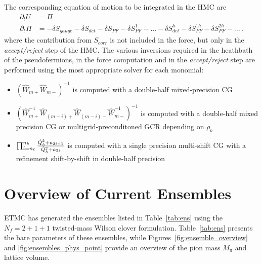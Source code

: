 \documentclass[a4paper,11pt]{article}
\begin{document}
The corresponding equation of motion to be integrated in the HMC are
\begin{align}
  \partial_t U   & =\Pi                \\
  \partial_t \Pi & =-\delta S_{gauge}-
  \delta S_{det} - \delta S_{PF} - \delta S_{PF}^1 -...-
  \delta S^h_{det} -\delta S^{1h}_{PF} - \delta S^{2h}_{PF}-...\,.
\end{align}
where  the contribution from $S_{corr}$ is not included in the force, but only in the \textit{accept/reject} step of the HMC.
The various inversions required in the heathbath of the pseudofermions, in the force computation and in the \textit{accept/reject} step are performed using the most appropriate solver for each monomial:
\begin{itemize}
  \item $(\hat W_{m+}\hat W_{m-})^{-1}$  is computed with a double-half mixed-precision CG
  \item   $(\hat W_{m+}^{-1}\hat W_{(m-i)+}\hat W_{(m-i)-}\hat W_{m-}^{-1})^{-1}$   is computed with a    double-half mixed precision CG or multigrid-preconditoned GCR depending on $\rho_b$
  \item  $\prod_{i=n_\ell}^{n_k} \frac{ \hat{Q}^2_h + a_{2i-1} }{ \hat{Q}^2_h + a_{2i} }$ is computed with a single precision multi-shift CG with a refinement shift-by-shift in double-half precision
\end{itemize}



\section{Overview of Current Ensembles}

ETMC has generated the ensembles listed in Table~\ref{tab:ens} using the \(N_f = 2+1+1\) twisted-mass Wilson clover formulation. Table~\ref{tab:ens} presents the bare parameters of these ensembles, while Figures~\ref{fig:ensemble_overview} and \ref{fig:ensembles_phys_point} provide an overview of the pion mass \(M_\pi\) and lattice volume.
\end{document}
